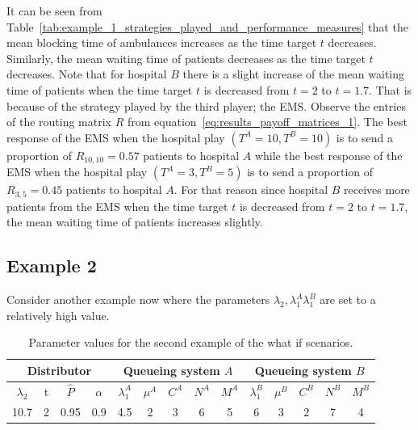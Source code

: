 It can be seen from
Table~\ref{tab:example_1_strategies_played_and_performance_measures} that the
mean blocking time of ambulances increases as the time target \(t\) decreases.
Similarly, the mean waiting time of patients decreases as the time target \(t\)
decreases.
Note that for hospital \(B\) there is a slight increase of the mean waiting time
of patients when the time target \(t\) is decreased from \(t = 2\) to
\(t = 1.7\).
That is because of the strategy played by the third player; the EMS.
Observe the entries of the routing matrix \(R\) from
equation~\eqref{eq:results_payoff_matrices_1}.
The best response of the EMS when the hospital play \((T^A=10, T^B=10)\) is
to send a proportion of \(R_{10, 10} = 0.57\) patients to hospital \(A\)
while the best response of the EMS when the hospital play \((T^A=3, T^B=5)\)
is to send a proportion of \(R_{3, 5} = 0.45\) patients to hospital \(A\).
For that reason since hospital \(B\) receives more patients from the EMS when
the time target \(t\) is decreased from \(t = 2\) to \(t = 1.7\), the mean 
waiting time of patients increases slightly.


\subsection{Example 2}

Consider another example now where the parameters \(\lambda_2, \lambda_1^A
\lambda_1^B\) are set to a relatively high value.

\begin{table}[H]
    \caption{Parameter values for the second example of the what if scenarios.}
    \begin{center}
        \begin{tabular}{||c|c|c|c||c|c|c|c|c||c|c|c|c|c||}
            \hline
            \multicolumn{4}{||c||}{\textbf{Distributor}} &
            \multicolumn{5}{c||}{\textbf{Queueing system \(A\)}} &
            \multicolumn{5}{c||}{\textbf{Queueing system \(B\)}} \\
            \hline
            \(\lambda_2\) & t & \footnotesize{\(\hat{P}\)} & \(\alpha\) &
            \(\lambda_1^A\) & \(\mu^A\) & \(C^A\) & \(N^A\) & \(M^A\) &
            \(\lambda_1^B\) & \(\mu^B\) & \(C^B\) & \(N^B\) & \(M^B\) \\
            \hline
            10.7 & 2 & 0.95 & 0.9 & 4.5 & 2 & 3 & 6 & 5 & 6 & 3 & 2 & 7 & 4 \\
            \hline
        \end{tabular}
    \end{center}
    \label{tab:results_what_if_example_2}
\end{table}

